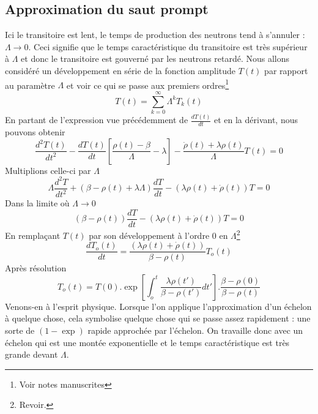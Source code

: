 \subsection{Approximation du saut prompt}
Ici le transitoire est lent, le temps de production des neutrons tend à s'annuler : $\Lambda\to0$. 
Ceci signifie que le temps caractéristique du transitoire est très supérieur à $\Lambda$ et donc le
transitoire est gouverné par les neutrons retardé. Nous allons considéré un développement en série 
de la fonction amplitude $T(t)$ par rapport au paramètre $\Lambda$ et voir ce qui se passe aux
premiers ordres\footnote{Voir notes manuscrites}
\begin{equation}
T(t) = \sum\limits_{k = 0}^\infty    {\Lambda ^k}{T_k}(t)
\end{equation}
En partant de l'expression vue précédemment de $\frac{dT(t)}{dt}$ et en la dérivant, nous pouvons
obtenir
\begin{equation}
\dfrac{d^2T(t)}{dt^2} - \dfrac{dT(t)}{dt}\left[\frac{\rho(t)-\beta}{\Lambda}-\lambda\right]-\frac{\dot \rho(t)+\lambda\rho(t)}{\Lambda}T(t)=0
\end{equation}
Multiplions celle-ci par $\Lambda$
\begin{equation}
\Lambda \frac{{{d^2}T}}{{d{t^2}}} + (\beta  - \rho (t) + \lambda \Lambda )\frac{{dT}}{{dt}} - (\lambda \rho (t) + \dot \rho (t))T = 0
\end{equation}
Dans la limite où $\Lambda\to0$
\begin{equation}
(\beta  - \rho (t) )\frac{{dT}}{{dt}} - (\lambda \rho (t) + \dot \rho (t))T = 0
\end{equation}
En remplaçant $T(t)$ par son développement à l'ordre 0 en $\Lambda$\footnote{Revoir.}
\begin{equation}
\frac{{d{T_o}(t)}}{{dt}} = \frac{{(\lambda \rho (t) + \dot \rho (t))}}{{\beta  - \rho (t)}}{T_o}(t)
\end{equation}
Après résolution
\begin{equation}
{T_o}(t) = T(0).\exp \left. {\left[ {\int_o^t   \frac{{\lambda \rho (t')}}{{\beta  - \rho (t')}}dt'} \right.} \right].\frac{{\beta  - \rho (0)}}{{\beta  - \rho (t)}}
\end{equation}
Venons-en à l'esprit physique. Lorsque l'on applique l'approximation d'un échelon à quelque chose, 
cela symbolise quelque chose qui se passe assez rapidement : une sorte de $(1-\exp)$ rapide approchée
par l'échelon. On travaille donc avec un échelon qui est une montée exponentielle et le temps 
caractéristique est très grande devant $\Lambda$.\\

